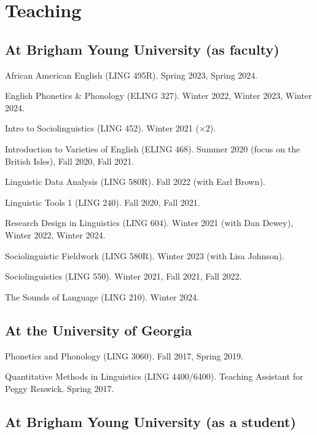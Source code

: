 \documentclass[
]{article}
\begin{document}
\hypertarget{teaching}{%
\section{Teaching}\label{teaching}}

\hypertarget{at-brigham-young-university-as-faculty}{%
\subsection{At Brigham Young University (as
faculty)}\label{at-brigham-young-university-as-faculty}}

African American English (LING 495R). Spring 2023, Spring 2024.

English Phonetics \& Phonology (ELING 327). Winter 2022, Winter 2023,
Winter 2024.

Intro to Sociolinguistics (LING 452). Winter 2021 (×2).

Introduction to Varieties of English (ELING 468). Summer 2020 (focus on
the British Isles), Fall 2020, Fall 2021.

Linguistic Data Analysis (LING 580R). Fall 2022 (with Earl Brown).

Linguistic Tools 1 (LING 240). Fall 2020, Fall 2021.

Research Design in Linguistics (LING 604). Winter 2021 (with Dan Dewey),
Winter 2022, Winter 2024.

Sociolinguistic Fieldwork (LING 580R). Winter 2023 (with Lisa Johnson).

Sociolinguistics (LING 550). Winter 2021, Fall 2021, Fall 2022.

The Sounds of Language (LING 210). Winter 2024.

\hypertarget{at-the-university-of-georgia}{%
\subsection{At the University of
Georgia}\label{at-the-university-of-georgia}}

Phonetics and Phonology (LING 3060). Fall 2017, Spring 2019.

Quantitative Methods in Linguistics (LING 4400/6400). Teaching Assistant
for Peggy Renwick. Spring 2017.

\hypertarget{at-brigham-young-university-as-a-student}{%
\subsection{At Brigham Young University (as a
student)}\label{at-brigham-young-university-as-a-student}}
\end{document}
